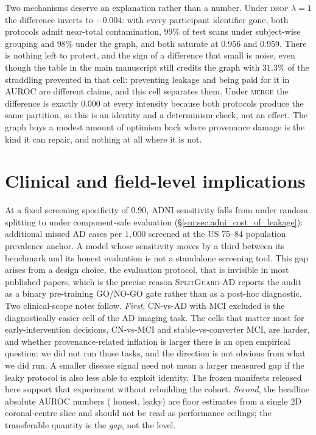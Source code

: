 \documentclass[11pt]{article}
\newcommand{\SGA}{\textsc{SplitGuard-AD}}
\begin{document}
Two mechanisms deserve an explanation rather than a number. Under
\textsc{drop} $\lambda = 1$ the difference inverts to $-0.004$: with every
participant identifier gone, both protocols admit near-total
contamination, $99\%$ of test scans under subject-wise grouping and $98\%$
under the graph, and both saturate at $0.956$ and $0.959$. There is
nothing left to protect, and the sign of a difference that small is
noise, even though the table in the main manuscript still credits the
graph with $31.3\%$ of the straddling prevented in that cell: preventing leakage and being paid for it in
AUROC are different claims, and this cell separates them. Under
\textsc{merge} the difference is exactly $0.000$ at every intensity
because both protocols produce the same partition, so this is an identity
and a determinism check, not an effect. The graph buys a modest amount of
optimism back where provenance damage is the kind it can repair, and
nothing at all where it is not.



\section{Clinical and field-level implications}
\label{sm:sec:discussion_clinical}

At a fixed screening specificity of $0.90$, ADNI sensitivity falls
from \SensLeaky{} under random splitting to \SensSafe{} under component-safe
evaluation (\S\ref{sm:sec:adni_cost_of_leakage}): \MissedPerThousand{}
additional missed AD cases per $1{,}000$ screened at the US 75--84
population prevalence anchor. A model whose sensitivity moves by a
third between its benchmark and its honest evaluation is not a
standalone screening tool. This
gap arises from a design choice, the evaluation protocol, that is
invisible in most published papers, which is the precise reason
\SGA{} reports the audit as a binary pre-training GO/NO-GO gate
rather than as a post-hoc diagnostic. Two clinical-scope notes
follow. \emph{First}, CN-vs-AD with MCI excluded is the
diagnostically easier cell of the AD imaging task. The cells that
matter most for early-intervention decisions, CN-vs-MCI and
stable-vs-converter MCI, are harder, and whether provenance-related
inflation is larger there is an open empirical question: we did not
run those tasks, and the direction is not obvious from what we did
run. A smaller disease signal need not mean a larger measured gap if
the leaky protocol is also less able to exploit identity. The frozen
manifests released here support that experiment without rebuilding
the cohort.
\emph{Second}, the headline absolute AUROC numbers (\AdniSafeAUROC{}
honest, \AdniRandomAUROC{} leaky) are floor estimates from a single 2D coronal-centre
slice and should not be read as performance ceilings; the
transferable quantity is the \emph{gap}, not the level.
\end{document}
